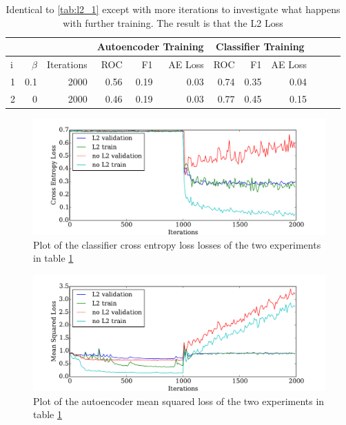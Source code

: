         \begin{table}[!h] {\footnotesize \centering
          \begin{tabular}{lrrrrrrrrrrr}
            &&&   \multicolumn{3}{|c|}{Autoencoder Training} &  \multicolumn{3}{c|}{Classifier Training}    \\
          \hline
           i &   $\beta$ &   Iterations &   ROC&F1&AE Loss & ROC & F1 & AE Loss \\
          \hline
           1 &       0.1 & 2000 &    0.56 &   0.19 &     0.03 &    0.74 &   0.35 &     0.04\\
           2 &       0   & 2000 &    0.46 &   0.19 &     0.03 &    0.77 &   0.45 &     0.15\\
          \hline
        \end{tabular}
        \caption{Identical to \ref{tab:l2_1} except with more iterations to investigate what happens with further training. The result is that
        the L2 Loss }
        \label{tab:l2_2} }
        \end{table}

        \begin{figure}[!h]
        \centering
        \includegraphics[width =0.8\hsize]{figures/l2.pdf}
        \caption{Plot of the classifier cross entropy loss losses of the two experiments in table \ref{tab:l2_2} }
        \label{fig:l2_1}
        \end{figure}

        \begin{figure}[!h]
        \centering
        \includegraphics[width =0.8\hsize]{figures/l2_auto.pdf}
        \caption{Plot of the autoencoder mean squared loss of the two experiments in table \ref{tab:l2_2} }
        \label{fig:l2_2}
        \end{figure}

